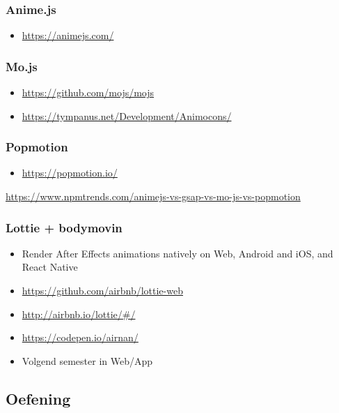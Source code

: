 \documentclass{article}
\begin{document}
\subsubsection{Anime.js}

\begin{itemize}
    \item \url{https://animejs.com/}
\end{itemize}

\subsubsection{Mo.js}

\begin{itemize}
    \item \url{https://github.com/mojs/mojs}
    \item \url{https://tympanus.net/Development/Animocons/}
\end{itemize}

\subsubsection{Popmotion}

\begin{itemize}
    \item \url{https://popmotion.io/}
\end{itemize}

\url{https://www.npmtrends.com/animejs-vs-gsap-vs-mo-js-vs-popmotion}

\subsubsection{Lottie + bodymovin}

\begin{itemize}
    \item Render After Effects animations natively on Web, Android and iOS, and React Native
    \item \url{https://github.com/airbnb/lottie-web}
    \item \url{http://airbnb.io/lottie/#/}
    \item \url{https://codepen.io/airnan/}
    \item Volgend semester in Web/App
\end{itemize}

\subsection{Oefening}
\end{document}
